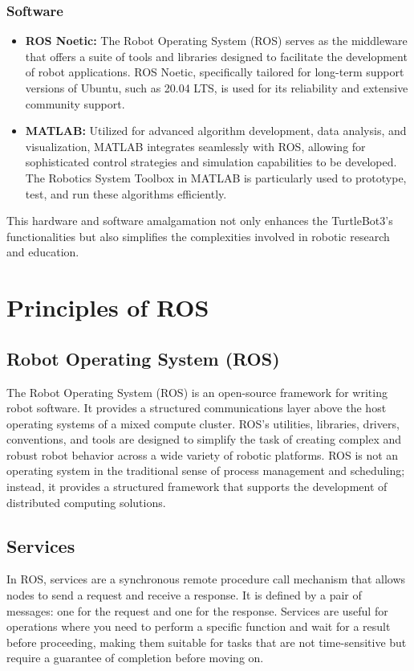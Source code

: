 \documentclass{article}
\begin{document}
	\subsubsection*{Software}
	\begin{itemize}
		\item \textbf{ROS Noetic:} The Robot Operating System (ROS) serves as the middleware that offers a suite of tools and libraries designed to facilitate the development of robot applications. ROS Noetic, specifically tailored for long-term support versions of Ubuntu, such as 20.04 LTS, is used for its reliability and extensive community support.
		\item \textbf{MATLAB:} Utilized for advanced algorithm development, data analysis, and visualization, MATLAB integrates seamlessly with ROS, allowing for sophisticated control strategies and simulation capabilities to be developed. The Robotics System Toolbox in MATLAB is particularly used to prototype, test, and run these algorithms efficiently.
	\end{itemize}
	
	This hardware and software amalgamation not only enhances the TurtleBot3’s functionalities but also simplifies the complexities involved in robotic research and education.
	
	\section{Principles of ROS}
	\subsection{Robot Operating System (ROS)}
	The Robot Operating System (ROS) is an open-source framework for writing robot software. It provides a structured communications layer above the host operating systems of a mixed compute cluster. ROS's utilities, libraries, drivers, conventions, and tools are designed to simplify the task of creating complex and robust robot behavior across a wide variety of robotic platforms. ROS is not an operating system in the traditional sense of process management and scheduling; instead, it provides a structured framework that supports the development of distributed computing solutions.
	
	\subsection{Services}
	In ROS, services are a synchronous remote procedure call mechanism that allows nodes to send a request and receive a response. It is defined by a pair of messages: one for the request and one for the response. Services are useful for operations where you need to perform a specific function and wait for a result before proceeding, making them suitable for tasks that are not time-sensitive but require a guarantee of completion before moving on.
	
\end{document}
